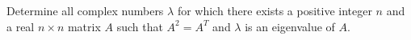 Determine all complex numbers $\lambda$ for which there exists a positive integer $n$ and a real $n\times n$ matrix $A$ such that $A^2=A^T$ and $\lambda$ is an eigenvalue of $A$.